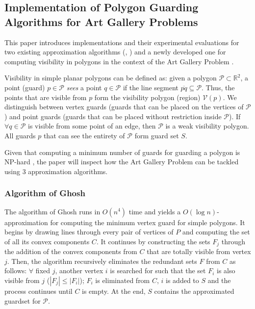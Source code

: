 \subsection{Implementation of Polygon Guarding Algorithms for Art Gallery Problems \cite{maleki2022implementation}}
This paper \cite{maleki2022implementation} introduces implementations and their experimental evaluations for two existing approximation algorithms (\cite{GHOSH2010718}, \cite{bhattacharya2016approximability}) and a newly developed one for computing visibility in polygons in the context of the Art Gallery Problem \cite{o1987art}.

Visibility in simple planar polygons can be defined as: given a polygon $\mathcal P \subset \mathbb R^2$, a point (guard) $p \in \mathcal P$ \textit{sees} a point $q \in \mathcal P$ if the line segment $\overline{pq} \subseteq \mathcal P$. Thus, the points that are visible from $p$ form the visibility polygon (region) $\mathcal V(p)$. We distinguish between vertex guards (guards that can be placed on the vertices of $\mathcal P$) and point guards (guards that can be placed without restriction inside $\mathcal P$). If $\forall q \in \mathcal P$ is visible from some point of an edge, then $\mathcal P$ is a weak visibility polygon. All guards $p$ that can see the entirety of $\mathcal P$ form guard set $S$.

Given that computing a minimum number of guards for guarding a polygon is NP-hard \cite{1057165}, the paper will inspect how the Art Gallery Problem \cite{o1987art} can be tackled using 3 approximation algorithms.

\subsubsection{Algorithm of Ghosh \cite{GHOSH2010718}}
The algorithm of Ghosh \cite{GHOSH2010718} runs in $O(n^4)$ time and yields a $O(\log n)$-approximation for computing the minimum vertex guard for simple polygons. It begins by drawing lines through every pair of vertices of $P$ and computing the set of all its convex components $C$. It continues by constructing the sets $F_j$ through the addition of the convex components from $C$ that are totally visible from vertex $j$. Then, the algorithm recursively eliminates the redundant sets $F$ from $C$ as follows: $\forall$ fixed $j$, another vertex $i$ is searched for such that the set $F_i$ is also visible from $j$ ($|F_j| \leq |F_i|$); $F_i$ is eliminated from $C$, $i$ is added to $S$ and the process continues until $C$ is empty. At the end, $S$ contains the approximated guardset for $\mathcal P$.

